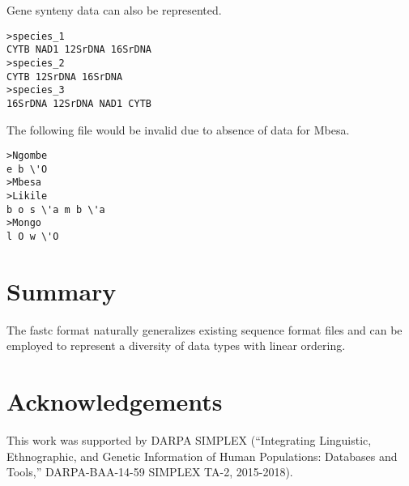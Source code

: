 \documentclass[12pt]{article}
\begin{document}
Gene synteny data can also be represented.
\begin{verbatim}
>species_1
CYTB NAD1 12SrDNA 16SrDNA
>species_2
CYTB 12SrDNA 16SrDNA
>species_3
16SrDNA 12SrDNA NAD1 CYTB
\end{verbatim}

The following file would be invalid due to absence of data for Mbesa.

\begin{verbatim}
>Ngombe
e b \'O
>Mbesa
>Likile
b o s \'a m b \'a
>Mongo
l O w \'O
\end{verbatim}
\doublespace
\section{Summary}
The fastc format naturally generalizes existing sequence format files and can be employed to
represent a diversity of
data types with linear ordering.

\section{Acknowledgements}
This work was supported by DARPA SIMPLEX (``Integrating Linguistic, Ethnographic, and Genetic Information of Human Populations: Databases and Tools,'' DARPA-BAA-14-59 SIMPLEX TA-2, 2015-2018). 
\newpage

\end{document}

